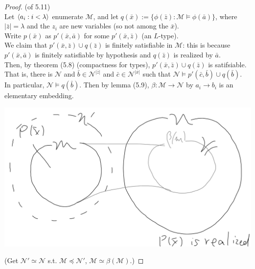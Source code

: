 \documentclass[a4paper]{article}
\begin{document}
\begin{proof} (of 5.11)\\
    Let $\langle a_i:i<\lambda \rangle$ enumerate $\mathcal{M}$, and let $q(\bar{x}) := \{\phi(\bar{z}): \mathcal{M} \vDash \phi(\bar{a})\}$, where $|\bar{z}| = \lambda$ and the $z_i$ are new variables (so not among the $\bar{x}$).\\
    Write $p(\bar{x})$ as $p'(\bar{x},\bar{a})$ for some $p'(\bar{x},\bar{z})$ (an $L$-type).\\
    We claim that $p'(\bar{x},\bar{z}) \cup q(\bar{z})$ is finitely satisfiable in $\mathcal{M}$: this is because $p'(\bar{x},\bar{a})$ is finitely satisfiable by hypothesis and $q(\bar{z})$ is realized by $\bar{a}$.\\
    Then, by theorem (5.8) (compactness for types), $p'(\bar{x},\bar{z}) \cup q(\bar{z})$ is satifsiable.\\
    That is, there is $\mathcal{N}$ and $\bar{b} \in \mathcal{N}^{|\bar{z}|}$ and $\bar{c} \in \mathcal{N}^{|\bar{x}|}$ such that $\mathcal{N} \vDash p'(\bar{c},\bar{b}) \cup q(\bar{b})$.\\
    In particular, $\mathcal{N} \vDash q(\bar{b})$. Then by lemma (5.9), $\beta: \mathcal{M} \to \mathcal{N}$ by $a_i \to b_i$ is an elementary embedding.

    \includegraphics[scale=0.5]{image/Model_07.png}

    (Get $\mathcal{N}' \simeq \mathcal{N}$ s.t. $\mathcal{M} \preccurlyeq \mathcal{N}'$, $\mathcal{M} \simeq \beta(\mathcal{M})$.)
\end{proof}
\end{document}
